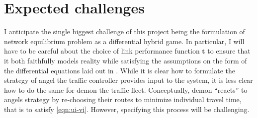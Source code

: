 \section{Expected challenges}

I anticipate the single biggest challenge of this project being the formulation of network equilibrium problem as a differential hybrid game. In particular, I will have to be careful about the choice of link performance function $\mathbf{t}$ to ensure that it both faithfully models reality while satisfying the assumptions on the form of the differential equations laid out in \citet{DBLP:journals/tocl/Platzer17}. While it is clear how to formulate the strategy of angel the traffic controller provides input to the system, it is less clear how to do the same for demon the traffic fleet. Conceptually, demon ``reacts'' to angels strategy by re-choosing their routes to minimize individual travel time, that is to satisfy \eqref{eqn:ui-vi}. However, specifying this process will be challenging.